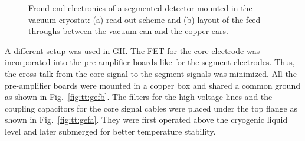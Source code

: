 \begin{figure}[tbhp]
\centering
{}\hfil%
%
\caption{Frond-end electronics of a segmented detector mounted in the vacuum cryostat: (a) read-out scheme and (b) layout of the feed-throughs between the vacuum can and the copper ears.}
\label{fig:tt:sif}
\end{figure}

A different setup was used in GII. The FET for the core electrode was incorporated into the pre-amplifier boards like for the segment electrodes. Thus, the cross talk from the core signal to the segment signals was minimized. All the pre-amplifier boards were mounted in a copper box and shared a common ground as shown in Fig.~\ref{fig:tt:gefb}. The filters for the high voltage lines and the coupling capacitors for the core signal cables were placed under the top flange as shown in Fig.~\ref{fig:tt:gefa}. They were first operated above the cryogenic liquid level and later submerged for better temperature stability.

